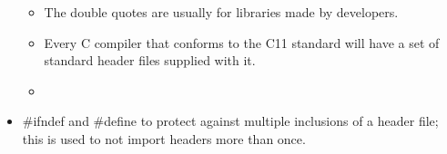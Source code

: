 \begin{itemize}
\begin{itemize}
            \item The double quotes are usually for libraries made by developers.
            \item Every C compiler that conforms to the C11 standard will have a set of standard header files supplied with it.
            \item  
        \end{itemize}
    
    \item \#ifndef and \#define to protect against multiple inclusions of a header file; this is used to not import headers more than once.
\end{itemize}
